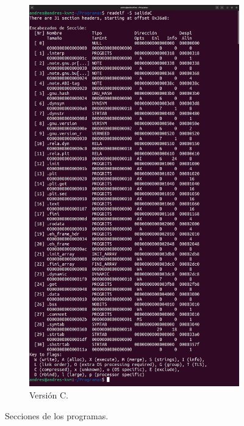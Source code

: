 \documentclass{article}
\begin{document}
\begin{figure}[H]
    \hfill
    \begin{subfigure}{0.49\textwidth}
        \centering
        \includegraphics[width=\textwidth]{imagenes/C/merged.png}
        \caption{Versión C.}
    \end{subfigure}

    \caption{Secciones de los programas.}
\end{figure}

\newpage
\end{document}
